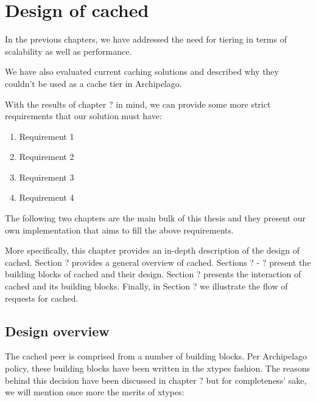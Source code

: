 \chapter{Design of cached}\label{ch:cached-design}

In the previous chapters, we have addressed the need for tiering in terms of
scalability as well as performance. %

We have also evaluated current caching solutions and described why they couldn't 
be used as a cache tier in Archipelago. %

With the results of chapter ? in mind, we can provide some more strict 
requirements that our solution must have:

\begin{enumerate}
	\item Requirement 1
	\item Requirement 2
	\item Requirement 3
	\item Requirement 4
\end{enumerate}

The following two chapters are the main bulk of this thesis and they present our 
own implementation that aims to fill the above requirements.

More specifically, this chapter provides an in-depth description of the design 
of cached.  Section ?  provides a general overview of cached. Sections ? - ?  
present the building blocks of cached and their design. Section ? presents the 
interaction of cached and its building blocks. Finally, in Section ? we 
illustrate the flow of requests for cached.

\section{Design overview}

\begin{comment}
In order to provide a caching tier for Archipelago that would blabla our 
requirements, we had to create our own implementation. Its name is simply cached 
(\textbf{cache d}aemon) and is another XSEG peer with similar structure to those 
seen in chapter ? %
\end{comment}

The cached peer is comprised from a number of building blocks. Per Archipelago 
policy, these building blocks have been written in the xtypes fashion. The 
reasons behind this decision have been discussed in chapter ?
but for completeness' sake, we will mention once more the merits of xtypes:

